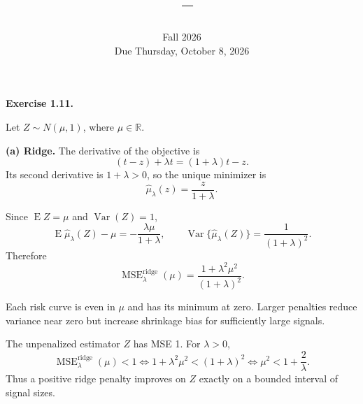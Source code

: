 \documentclass[answers,12pt,addpoints]{exam}
\author{\name}
\title{\course\ -- \assignment}
\date{Fall 2026\\Due Thursday, October 8, 2026}
\providecommand{\R}{\mathbb{R}}
\providecommand{\E}{\operatorname{E}}
\providecommand{\argmin}{\operatorname*{arg\,min}}
\providecommand{\Var}{\operatorname{Var}}
\providecommand{\MSE}{\operatorname{MSE}}
\begin{document}
\maketitle

\begin{questions}

\question \textbf{Exercise 1.11.}

Let $Z\sim N(\mu,1)$, where $\mu\in\R$.


\begin{solution}

\textbf{(a) Ridge.}
The derivative of the objective is
\[
(t-z)+\lambda t=(1+\lambda)t-z.
\]
Its second derivative is $1+\lambda>0$, so the unique minimizer is
\[
\boxed{
\widehat\mu_\lambda(z)=\frac{z}{1+\lambda}.
}
\]

Since $\E Z=\mu$ and $\Var(Z)=1$,
\[
\E\widehat\mu_\lambda(Z)-\mu
=
-\frac{\lambda\mu}{1+\lambda},
\qquad
\Var\{\widehat\mu_\lambda(Z)\}
=
\frac{1}{(1+\lambda)^2}.
\]
Therefore
\[
\boxed{
\MSE_\lambda^{\mathrm{ridge}}(\mu)
=
\frac{1+\lambda^2\mu^2}{(1+\lambda)^2}.
}
\]

Each risk curve is even in $\mu$ and has its minimum at zero.
Larger penalties reduce variance near zero but increase shrinkage
bias for sufficiently large signals.

The unpenalized estimator $Z$ has MSE 1. For $\lambda>0$,
\[
\MSE_\lambda^{\mathrm{ridge}}(\mu)<1
\iff
1+\lambda^2\mu^2<(1+\lambda)^2
\iff
\boxed{
\mu^2<1+\frac{2}{\lambda}.
}
\]
Thus a positive ridge penalty improves on $Z$ exactly on a bounded
interval of signal sizes.


\end{solution}
\end{questions}
\end{document}
